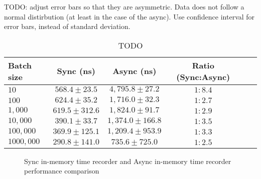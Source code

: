TODO: adjust error bars so that they are asymmetric. Data does not follow a normal distirbution (at least in the case of the async). Use confidence interval for error bars, instead of standard deviation.

\begin{table}[h]
  \begin{minipage}[c]{\linewidth}
    
    \begin{center}
      \begin{tabular}{l*{4}{c}r}
        Batch size & Sync (ns) & Async (ns) & Ratio (Sync:Async) \\
        \hline
        $10$ & $568.4 \pm 23.5$ & $4,795.8 \pm 27.2$ & $1:8.4$ \\
        $100$ & $624.4 \pm 35.2$ & $1,716.0 \pm 32.3$ & $1:2.7$ \\
        $1,000$ & $619.5 \pm 312.6$ & $1,824.0 \pm 91.7$ & $1:2.9$ \\
        $10,000$ & $390.1 \pm 33.7$ & $1,374.0 \pm 166.8$ & $1:3.5$ \\
        $100,000$ & $369.9 \pm 125.1$ & $1,209.4 \pm 953.9$ & $1:3.3$ \\
        $1000,000$ & $290.8 \pm 141.0$ & $735.6 \pm 725.0$ & $1:2.5$ \\
      \end{tabular}
    \end{center}
    \caption{TODO}
    \label{tab:timerecorerimplementation:performancecomparison}
  \end{minipage}
\end{table}

\begin{figure}
  \centering
  \caption{Sync in-memory time recorder and Async in-memory time recorder performance comparison}
  \label{fig:timerecorerimplementation:performancecomparison}
\end{figure}

